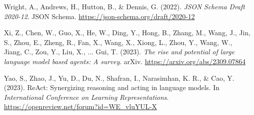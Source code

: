 \documentclass[11pt]{article}
\begin{document}
Wright, A., Andrews, H., Hutton, B., \& Dennis, G. (2022). \textit{JSON Schema
Draft 2020-12}. JSON Schema. \url{https://json-schema.org/draft/2020-12}

Xi, Z., Chen, W., Guo, X., He, W., Ding, Y., Hong, B., Zhang, M., Wang, J.,
Jin, S., Zhou, E., Zheng, R., Fan, X., Wang, X., Xiong, L., Zhou, Y., Wang, W.,
Jiang, C., Zou, Y., Liu, X., ... Gui, T. (2023). \textit{The rise and potential
of large language model based agents: A survey}. arXiv.
\url{https://arxiv.org/abs/2309.07864}

Yao, S., Zhao, J., Yu, D., Du, N., Shafran, I., Narasimhan, K. R., \& Cao, Y.
(2023). ReAct: Synergizing reasoning and acting in language models. In
\textit{International Conference on Learning Representations}.
\url{https://openreview.net/forum?id=WE_vluYUL-X}
\end{document}
